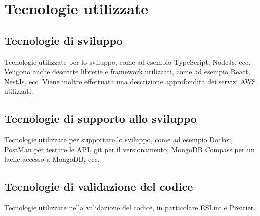 \section{Tecnologie utilizzate}
\label{sez:tecnologie-utilizzate}

\subsection{Tecnologie di sviluppo}
\label{sez:tecnologie-sviluppo}

Tecnologie utilizzate per lo sviluppo, come ad esempio TypeScript, NodeJs, ecc.
Vengono anche descritte librerie e framework utilizzati, come ad esempio React, NestJs, ecc.
Viene inoltre effettuata una descrizione approfondita dei servizi AWS utilizzati.

\subsection{Tecnologie di supporto allo sviluppo}
\label{sez:tecnologie-supporto-sviluppo}

Tecnologie utilizzate per supportare lo sviluppo, come ad esempio Docker, PostMan per testare le API, git per il versionamento, MongoDB Compass per un facile accesso a MongoDB, ecc.

\subsection{Tecnologie di validazione del codice}
\label{sez:tecnologie-validazione-codice}

Tecnologie utilizzate nella validazione del codice, in particolare ESLint e Prettier. 